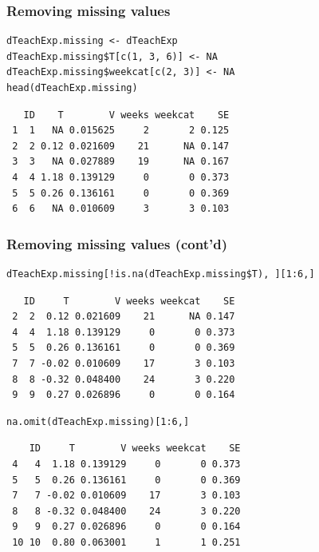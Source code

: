 \documentclass[bigger]{beamer}
\begin{document}
\begin{frame}[fragile,shrink = 20]
\frametitle{Removing missing values}
\label{sec-4-1-6}


\lstset{language=R}
\begin{lstlisting}
dTeachExp.missing <- dTeachExp
dTeachExp.missing$T[c(1, 3, 6)] <- NA
dTeachExp.missing$weekcat[c(2, 3)] <- NA
head(dTeachExp.missing)
\end{lstlisting}

\begin{verbatim}
   ID    T        V weeks weekcat    SE
 1  1   NA 0.015625     2       2 0.125
 2  2 0.12 0.021609    21      NA 0.147
 3  3   NA 0.027889    19      NA 0.167
 4  4 1.18 0.139129     0       0 0.373
 5  5 0.26 0.136161     0       0 0.369
 6  6   NA 0.010609     3       3 0.103
\end{verbatim}
\end{frame}
\begin{frame}[fragile,shrink = 20]
\frametitle{Removing missing values (cont'd)}
\label{sec-4-1-7}


\lstset{language=R}
\begin{lstlisting}
dTeachExp.missing[!is.na(dTeachExp.missing$T), ][1:6,]
\end{lstlisting}

\begin{verbatim}
   ID     T        V weeks weekcat    SE
 2  2  0.12 0.021609    21      NA 0.147
 4  4  1.18 0.139129     0       0 0.373
 5  5  0.26 0.136161     0       0 0.369
 7  7 -0.02 0.010609    17       3 0.103
 8  8 -0.32 0.048400    24       3 0.220
 9  9  0.27 0.026896     0       0 0.164
\end{verbatim}



\lstset{language=R}
\begin{lstlisting}
na.omit(dTeachExp.missing)[1:6,]
\end{lstlisting}

\begin{verbatim}
    ID     T        V weeks weekcat    SE
 4   4  1.18 0.139129     0       0 0.373
 5   5  0.26 0.136161     0       0 0.369
 7   7 -0.02 0.010609    17       3 0.103
 8   8 -0.32 0.048400    24       3 0.220
 9   9  0.27 0.026896     0       0 0.164
 10 10  0.80 0.063001     1       1 0.251
\end{verbatim}
\end{frame}
\end{document}
